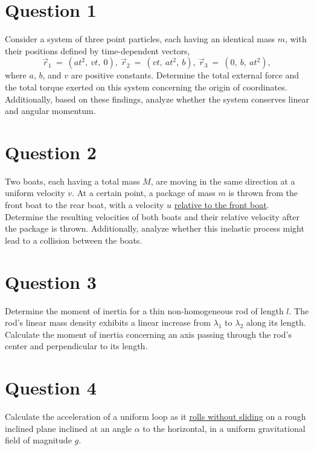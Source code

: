 \documentclass[a4paper,12pt]{article}
\begin{document}
\maketitle
\vspace{-1.5em}


\section*{Question 1}
Consider a system of three point particles, each having an identical mass $m$, with their positions defined by time-dependent vectors,
\begin{equation*}
    \vec r_{1}~=~(at^2,~vt,~0),~\vec r_{2}~=~(vt,~at^2,~b),~\vec r_{3}~=~(0,~b,~at^2), 
\end{equation*}
where $a$, $b$, and $v$ are positive constants. Determine the total external force and the total torque exerted on this system concerning the origin of coordinates. Additionally, based on these findings, analyze whether the system conserves linear and angular momentum.

\section*{Question 2}
Two boats, each having a total mass $M$, are moving in the same direction at a uniform velocity $v$. At a certain point, a package of mass $m$ is thrown from the front boat to the rear boat, with a velocity $u$ \underline{relative to the front boat}. Determine the resulting velocities of both boats and their relative velocity after the package is thrown. Additionally, analyze whether this inelastic process might lead to a collision between the boats.

\section*{Question 3}
Determine the moment of inertia for a thin non-homogeneous rod of length $l$. The rod's linear mass density exhibits a linear increase from $\lambda_1$ to $\lambda_2$ along its length. Calculate the moment of inertia concerning an axis passing through the rod's center and perpendicular to its length.

\section*{Question 4}
Calculate the acceleration of a uniform loop as it \underline{rolls without sliding} on a rough inclined plane inclined at an angle $\alpha$ to the horizontal, in a uniform gravitational field of magnitude $g$.
\end{document}
